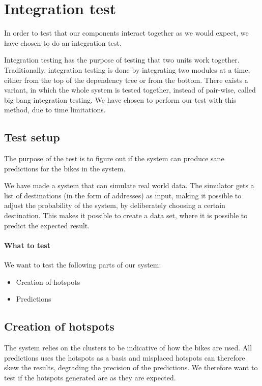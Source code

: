 \section{Integration test}

In order to test that our components interact together as we would expect, we have chosen to do an integration test.

Integration testing has the purpose of testing that two units work together. 
Traditionally, integration testing is done by integrating two modules at a time, either from the top of the dependency tree or from the bottom.
There exists a variant, in which the whole system is tested together, instead of pair-wise, called big bang integration testing.
We have chosen to perform our test with this method, due to time limitations. \cite{inttest}

\subsection{Test setup}
The purpose of the test is to figure out if the system can produce sane predictions for the bikes in the system.


We have made a system that can simulate real world data. 
The simulator gets a list of destinations (in the form of addresses) as input, making it possible to adjust the probability of the system, by deliberately choosing a certain destination.
This makes it possible to create a data set, where it is possible to predict the expected result.

\paragraph{What to test}
We want to test the following parts of our system:

\begin{itemize}
\item Creation of hotspots
\item Predictions
\end{itemize}

\subsection{Creation of hotspots}
The system relies on the clusters to be indicative of how the bikes are used. 
All predictions uses the hotspots as a basis and misplaced hotspots can therefore skew the results, degrading the precision of the predictions.
We therefore want to test if the hotspots generated are as they are expected.

